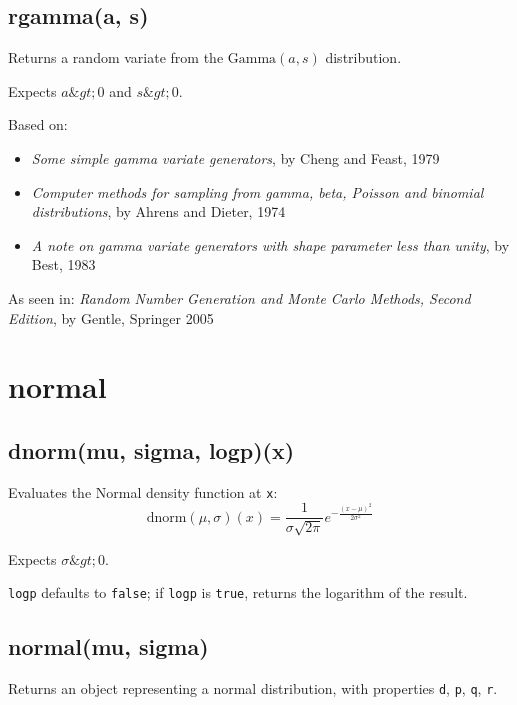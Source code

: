 \documentclass{article}
\begin{document}
    \subsection*{rgamma(a, s)}
    Returns a random variate from the $\textrm{Gamma}(a, s)$ distribution.


Expects $a \&gt; 0$ and $s \&gt; 0$.


Based on:


\begin{itemize}

\item \emph{Some simple gamma variate generators}, by Cheng and Feast, 1979

\item \emph{Computer methods for sampling from gamma, beta, Poisson and binomial
distributions}, by Ahrens and Dieter, 1974

\item \emph{A note on gamma variate generators with shape parameter less than
unity}, by Best, 1983

\end{itemize}

As seen in: \emph{Random Number Generation and Monte Carlo Methods, Second Edition},
by Gentle, Springer 2005


  \section{normal}
    \subsection*{dnorm(mu, sigma, logp)(x)}
    Evaluates the Normal density function at \texttt{x}:
$$\textrm{dnorm}(\mu, \sigma)(x) = \frac{1}{\sigma \sqrt{2\pi}} e^{\displaystyle -\frac{(x-\mu)^2}{2\sigma^2}}$$


Expects $\sigma \&gt; 0$.


\texttt{logp} defaults to \texttt{false}; if \texttt{logp} is \texttt{true}, returns the
logarithm of the result.


    \subsection*{normal(mu, sigma)}
    Returns an object representing a normal distribution, with properties \texttt{d}, \texttt{p}, \texttt{q}, \texttt{r}.
\end{document}
